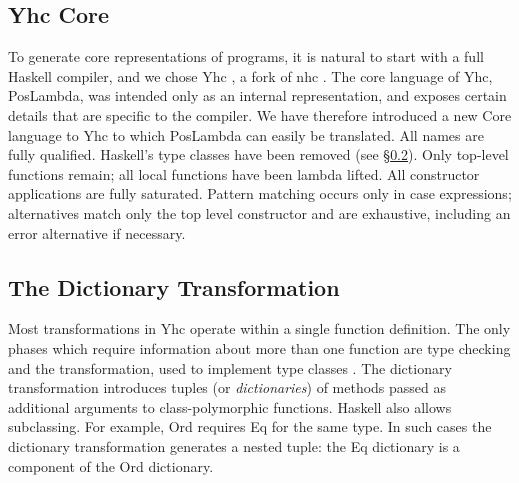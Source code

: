 \documentclass[preprint]{sigplanconf}
\let\cite=\citep
\newcommand{\C}[1]{\textsf{#1}}
\begin{document}
\subsection{Yhc Core}

\begin{comment}
-- a simple variant of lambda calculus without types, but with source position information. Yhc works by applying basic desugaring transformations, without optimisation. This simplicity ensures the generated PosLambda is close to the original Haskell in its structure. Each top-level function in a source file maps to a top-level function in the generated PosLambda, retaining the same name.

However, PosLambda has constructs that have no direct representation in Haskell. For example, there is a FatBar construct \cite{spj:implementation}, used for compiling pattern matches which require fall through behaviour. The PosLambda language
\end{comment}

To generate core representations of programs, it is natural to start with a full Haskell compiler, and we chose Yhc \citep{Yhc}, a fork of nhc \citep{nhc}. The core language of Yhc, PosLambda, was intended only as an internal representation, and exposes certain details that are specific to the compiler. We have therefore introduced a new Core language to Yhc to which PosLambda can easily be translated. All names are fully qualified. Haskell's type classes have been removed (see \S\ref{sec:dict}). Only top-level functions remain; all local functions have been lambda lifted. All constructor applications are fully saturated. Pattern matching occurs only in case expressions; alternatives match only the top level constructor and are exhaustive, including an \C{error} alternative if necessary.


\subsection{The Dictionary Transformation}
\label{sec:dict}

Most transformations in Yhc operate within a single function definition. The only phases which require information about more than one function are type checking and the transformation, used to implement type classes \citep{wadler:type_classes}. The dictionary transformation introduces tuples (or \textit{dictionaries}) of methods passed as additional arguments to class-polymorphic functions. Haskell also allows subclassing. For example, \C{Ord} requires \C{Eq} for the same type. In such cases the dictionary transformation generates a nested tuple: the \C{Eq} dictionary is a component of the \C{Ord} dictionary.
\end{document}
